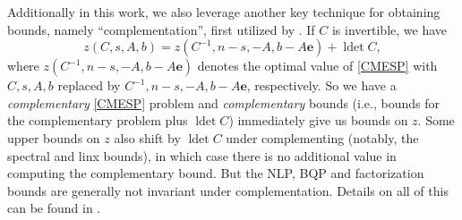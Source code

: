 \documentclass[smallextended]{svjour3hack}       %
\makeatletter
\DeclareMathOperator{\ldet}{ldet}
\DeclareMathOperator{\Trace}{tr}
\renewcommand*{\top}{%
  {\mathpalette\@transpose{}}%
}
\newcommand*{\@transpose}[2]{%
  \raisebox{\depth}{$\m@th#1\mathsf{T}$}%
}
\makeatother
\begin{document}
 Additionally in this work, we also leverage another key technique for obtaining bounds, namely  ``complementation'', first utilized by \cite{AFLW_IPCO,AFLW_Using}.
If $C$ is invertible,
we have
\[
z(C,s, A, b)=z(C^{-1},n-s,-A,b-A\mathbf{e}) + \ldet C,
\]
\noindent where $z(C^{-1},n-s,-A,b-A\mathbf{e})$ denotes the
optimal value of \ref{CMESP} with $C,s,A,b$ replaced by
$C^{-1},n-s,-A,b-A\mathbf{e}$, respectively.
So we have a
\emph{complementary} \ref{CMESP} problem
 and \emph{complementary} bounds
 (i.e., bounds for the
 complementary problem plus $\ldet C$)
 immediately give us bounds on
 $z$.
 Some upper bounds on $z$ also shift by  $\ldet C$  under complementing (notably, the spectral and linx bounds),
 in which case there is no additional value in computing the
 complementary bound. But the NLP, BQP and factorization bounds are generally not invariant under complementation.
 Details on all of this can be found in \cite{FLbook}.




\end{document}
